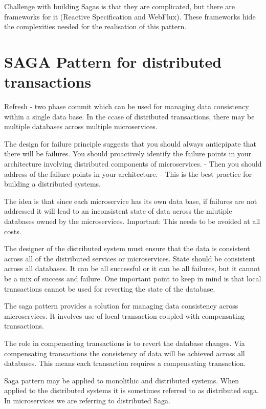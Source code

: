 \documentclass[a4paper, 11pt]{book}
\begin{document}
    Challenge with building Sagas is that they are complicated, but there are frameworks for it (Reactive Specification and WebFlux).
    These frameworks hide the complexities needed for the realisation of this pattern.


    \section{SAGA Pattern for distributed transactions}
    Refresh - two phase commit which can be used for managing data consistency within a single data base.
    In the ccase of distributed transactions, there may be multiple databases across multiple microservices.

    The design for failure principle suggests that you should always anticpipate that there will be failures.
    You should proactively identify the failure points in your architecture involving distributed components of microservices.
    - Then you should address of the failure points in your architecture.
    - This is the best practice for building a distributed systems.

    The idea is that since each microservice has its own data base, if failures are not addressed it will lead to an inconsistent state of data across the mlutiple databases owned by the microservices.
    Important: This needs to be avoided at all costs.

    The designer of the distributed system must ensure that the data is consistent across all of the distributed services or microservices.
    State should be consistent across all databases.
    It can be all successful or it can be all failures, but it cannot be a mix of success and failure.
    One important point to keep in mind is that local transactions cannot be used for reverting the state of the database.

    The saga pattern provides a solution for managing data consistency across microservices.
    It involves use of local transaction coupled with compensating transactions.

    The role in compensating transactions is to revert the database changes.
    Via compensating transactions the consistency of data will be achieved across all databases.
    This means each transaction requires a compensating transaction.

    Saga pattern may be applied to monolithic and distributed systems.
    When applied to the distributed systems it is sometimes referred to as distributed saga.
    In microservices we are referring to distributed Saga.
\end{document}
